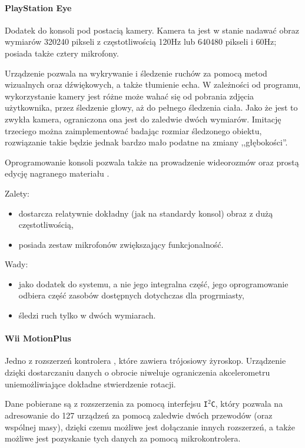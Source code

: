 \paragraph{PlayStation Eye}
Dodatek do konsoli  pod postacią kamery. Kamera ta jest w stanie nadawać obraz wymiarów 320\texttimes{}240 pikseli z częstotliwością 120Hz lub 640\texttimes{}480 pikseli i 60Hz; posiada także cztery mikrofony.

Urządzenie pozwala na wykrywanie i śledzenie ruchów za pomocą metod wizualnych oraz dźwiękowych, a także tłumienie echa. W zależności od programu, wykorzystanie kamery jest różne \ppauza może wahać się od pobrania zdjęcia użytkownika, przez śledzenie głowy, aż do pełnego śledzenia ciała. Jako że jest to zwykła kamera, ograniczona ona jest do zaledwie dwóch wymiarów. Imitację trzeciego można zaimplementować badając rozmiar śledzonego obiektu, rozwiązanie takie będzie jednak bardzo mało podatne na zmiany ,,głębokości''.

Oprogramowanie konsoli pozwala także na prowadzenie wideorozmów oraz prostą edycję nagranego materiału \citep{PSEye}.

Zalety:
\begin{itemize}
  \item dostarcza relatywnie dokładny (jak na standardy konsol) obraz z dużą częstotliwością,
  \item posiada zestaw mikrofonów zwiększający funkcjonalność.
\end{itemize}

Wady:
\begin{itemize}
  \item jako dodatek do systemu, a nie jego integralna część, jego oprogramowanie odbiera część zasobów dostępnych dotychczas dla progrmiasty,
  \item śledzi ruch tylko w dwóch wymiarach.
\end{itemize}

\paragraph{Wii MotionPlus}
Jedno z rozszerzeń kontrolera , które zawiera trójosiowy żyroskop. Urządzenie dzięki dostarczaniu danych o obrocie niweluje ograniczenia akcelerometru uniemożliwiające dokładne stwierdzenie rotacji.

Dane pobierane są z rozszerzenia za pomocą interfejsu \texttt{I$^2$C}, który pozwala na adresowanie do 127 urządzeń za pomocą zaledwie dwóch przewodów (oraz wspólnej masy), dzięki czemu możliwe jest dołączanie innych rozszerzeń, a także możliwe jest pozyskanie tych danych za pomocą mikrokontrolera.

